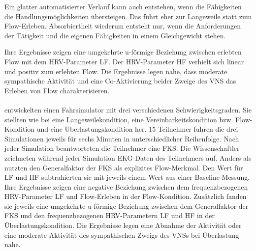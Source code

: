 Ein glatter automatisierter Verlauf kann auch entstehen, wenn die Fähigkeiten die Handlungsmöglichkeiten übersteigen. Das führt eher zur Langeweile statt zum Flow-Erleben. Absorbiertheit wiederum entsteht nur, wenn die Anforderungen der Tätigkeit und die eigenen Fähigkeiten in einem Gleichgewicht stehen.

Ihre Ergebnisse zeigen eine umgekehrte u-förmige Beziehung zwischen erlebten Flow mit dem \ac{HRV}-Parameter \acs{LF}. Der \ac{HRV}-Parameter \acs{HF} verhielt sich linear und positiv zum erlebten Flow. Die Ergebnisse legen nahe, dass moderate sympathische Aktivität und eine Co-Aktivierung beider Zweige des \ac{VNS} das Erleben von Flow charakterisieren.

\paragraph{\citet{Tozman2015}} 

\label{par:tozman2015}

entwickelten einen Fahrsimulator mit drei verschiedenen Schwierigkeitsgraden. Sie stellten wie bei \citet{Keller2011} eine Langeweilekondition, eine Vereinbarkeitskondition bzw. Flow-Kondition und eine Überlastungskondition her. 15 Teilnehmer fuhren die drei Simulationen jeweils für sechs Minuten in unterschiedlicher Reihenfolge. Nach jeder Simulation beantworteten die Teilnehmer eine \ac{FKS}. Die Wissenschaftler zeichneten während jeder Simulation \ac{EKG}-Daten des Teilnehmers auf. Anders als \citet{Peifer2014} nutzten \citet{Tozman2015} den Generalfaktor der \ac{FKS} als explizites Flow-Merkmal. Den Wert für \acs{LF} und \acs{HF} subtrahierten sie mit jeweils einem Wert aus einer Baseline-Messung. Ihre Ergebnisse zeigen eine negative Beziehung zwischen dem frequenzbezogenen \ac{HRV}-Parameter \acs{LF} und Flow-Erleben in der Flow-Kondition. Zusätzlich fanden sie jeweils eine umgekehrte u-förmige Beziehung zwischen dem Generalfaktor der \ac{FKS} und den frequenzbezogenen \ac{HRV}-Parametern \acs{LF} und \acs{HF} in der Überlastungskondition. Die Ergebnisse legen eine Abnahme der Aktivität oder eine moderate Aktivität des sympathischen Zweigs des \ac{VNS}s bei Überlastung nahe.

\paragraph{\citet{Harmat2015}} 

\label{par:harmat2015}

